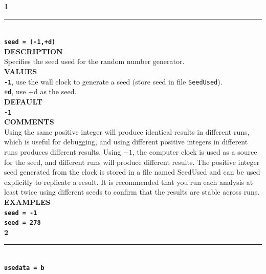 \documentclass{book}
\numberwithin{equation}{section} \renewcommand{\baselinestretch}{0.55}
\begin{document}
\textbf{{\large 1}} \\
\noindent\rule{\textwidth}{0.8pt} \\
\textbf{{\Large \texttt{seed = (-1,+d)}}} \vspace{5pt}\\
\textbf{DESCRIPTION} \vspace{5pt}\\
Specifies the seed used for the random number generator.\vspace{5pt}\\
\textbf{VALUES} \vspace{5pt}\\
\textbf{\texttt{-1}}, use the wall clock to generate a seed (store seed in file \texttt{SeedUsed}).\vspace{5pt}\\
\textbf{\texttt{+d}}, use +d as the seed.\vspace{10pt}\\
\textbf{DEFAULT} \vspace{5pt}\\
\textbf{\texttt{-1}} \vspace{5pt}\\
\textbf{COMMENTS} \vspace{5pt}\\
Using the same positive integer will produce identical results in
different runs, which is useful for debugging, and using different
positive integers in different runs produces different results.  Using
$-1$, the computer clock is used as a source for the seed, and
different runs will produce different results. The positive integer
seed generated from the clock is stored in a file named SeedUsed and
can be used explicitly to replicate a result. It is recommended that
you run each analysis at least
twice using different seeds to confirm that the results are stable across runs. \vspace{5pt}\\
\textbf{EXAMPLES} \vspace{5pt}\\
\textbf{\texttt{seed = -1}}\vspace{5pt}\\
\textbf{\texttt{seed = 278}}\vspace{10pt}\\
\textbf{{\large 2}} \\
\noindent\rule{\textwidth}{0.8pt} \\
\textbf{{\Large \texttt{usedata = b}}} \vspace{5pt}\\
\end{document}
